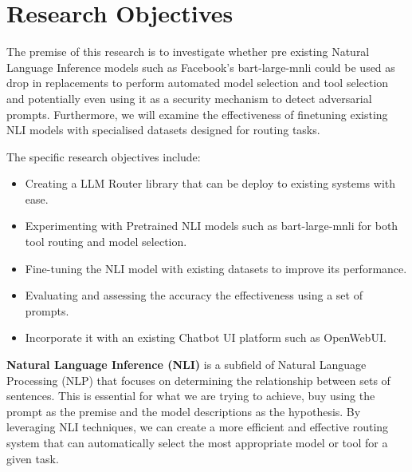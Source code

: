 \section{Research Objectives}
\label{sec:intro_aims_obj}

The premise of this research is to investigate whether pre existing Natural Language Inference models such as Facebook's bart-large-mnli could be used as drop in replacements to perform automated model selection and tool selection and potentially even using it as a security mechanism to detect adversarial prompts. Furthermore, we will examine the effectiveness of finetuning existing NLI models with specialised datasets designed for routing tasks.

The specific research objectives include:
\begin{itemize}
    \item Creating a LLM Router library that can be deploy to existing systems with ease.
    \item Experimenting with Pretrained NLI models such as bart-large-mnli for both tool routing and model selection.
    \item Fine-tuning the NLI model with existing datasets to improve its performance.
    \item Evaluating and assessing the accuracy the effectiveness using a set of prompts.
    \item Incorporate it with an existing Chatbot UI platform such as OpenWebUI.
\end{itemize}


\textbf{Natural Language Inference (NLI)} is a subfield of Natural Language Processing (NLP) that focuses on determining the relationship between sets of sentences. This is essential for what we are trying to achieve, buy using the prompt as the premise and the model descriptions as the hypothesis. By leveraging NLI techniques, we can create a more efficient and effective routing system that can automatically select the most appropriate model or tool for a given task.
